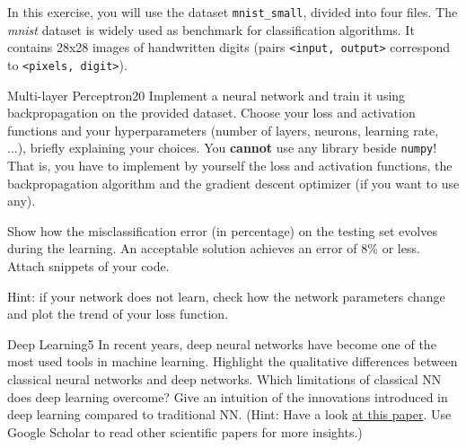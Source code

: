 \newif\ifvimbug
\vimbugfalse

\ifvimbug

\fi

In this exercise, you will use the dataset \texttt{mnist\_small}, divided into four files. The \textit{mnist} dataset is widely used as benchmark for classification algorithms. It contains 28x28 images of handwritten digits (pairs \texttt{<input, output>} correspond to \texttt{<pixels, digit>}).

\begin{questions}


\begin{question}{Multi-layer Perceptron}{20}
Implement a neural network and train it using backpropagation on the provided dataset. Choose your loss and activation functions and your hyperparameters (number of layers, neurons, learning rate, ...), briefly explaining your choices. You \textbf{cannot} use any library beside \texttt{numpy}! That is, you have to implement by yourself the loss and activation functions, the backpropagation algorithm and the gradient descent optimizer (if you want to use any).

Show how the misclassification error (in percentage) on the testing set evolves during the learning. An acceptable solution achieves an error of 8\% or less. Attach snippets of your code. 

Hint: if your network does not learn, check how the network parameters change and plot the trend of your loss function.

\begin{answer}\end{answer}

\end{question}


\begin{question}[bonus]{Deep Learning}{5}
In recent years, deep neural networks have become one of the most used tools in machine learning. 
Highlight the qualitative differences between classical neural networks and deep networks. Which limitations of classical NN does deep learning overcome?
Give an intuition of the innovations introduced in deep learning compared to traditional NN.
(Hint: Have a look \href{http://arxiv.org/abs/1206.5538}{at this paper}. Use Google Scholar to read other scientific papers for more insights.)

\begin{answer}\end{answer}

\end{question}


\end{questions}
